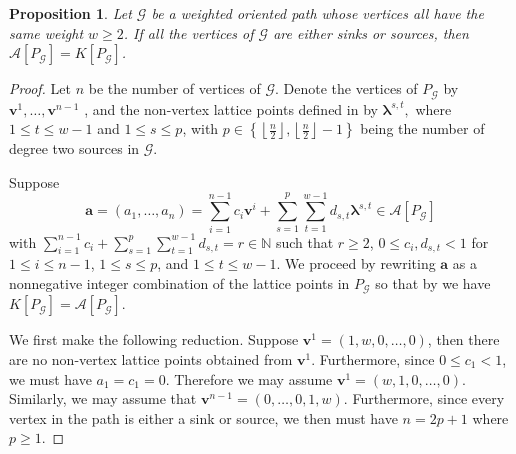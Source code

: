 \documentclass [12pt,a4paper,reqno]{amsart}
\theoremstyle{plain}
\newtheorem{Proposition}[Theorem]{Proposition}
\theoremstyle{definition}
\newtheorem{Assumptions and Discussion}[Theorem]{Assumptions and Discussion}
\theoremstyle{remark}
\newcommand\bflam{\boldsymbol{\lambda}}
\newcommand\calA{\mathcal{A}}
\newcommand\calG{\mathcal{G}}
\begin{document}
\begin{Proposition}
    \label{PathSinkSource}
    Let $\calG$ be a weighted oriented path whose vertices all have the same weight $w\geq 2$. If all the vertices of $\calG$ are either sinks or sources, then $ \calA[P_{\calG}]=K[P_{\calG}]$.
\end{Proposition}


\begin{proof}
Let $n$ be the number of vertices of $\mathcal{G}$. Denote the vertices of $P_{\mathcal{G}}$ by 
$\mathbf{v}^1, \dots, \mathbf{v}^{n-1}$ , 
and the non-vertex lattice points defined in  by $\boldsymbol{\lambda}^{s,t},$ where $1 \le t \le w-1$ and $1 \le s \le p$, with 
$p \in\left\{ \left\lfloor \frac{n}{2} \right\rfloor,\left\lfloor \frac{n}{2} \right\rfloor - 1\right\}$ being the number of degree two sources in $\mathcal{G}$.

Suppose 
\[\mathbf{a}=(a_1,\ldots,a_n) =\sum_{i=1}^{n-1}c_i\mathbf{v}^i+\sum_{s=1}^{p}\sum_{t=1}^{w-1}d_{s,t}\bflam^{s,t}\in \calA[P_{\calG}]\] 
with $\sum_{i=1}^{n-1}c_i+\sum_{s=1}^{p}\sum_{t=1}^{w-1}d_{s,t}=r\in\mathbb{N}$ such that $r\geq 2$, $0\leq c_i,d_{s,t}<1$ for $1\leq i\leq n-1$, $1\leq s\leq p$, and $1\leq t\leq w-1$. We proceed by rewriting $\mathbf{a}$ as a nonnegative integer combination of the lattice points in $P_{\calG}$ so that by  we have $K[P_{\calG}]=\calA[P_{\calG}]$. 

We first make the following reduction. Suppose $\mathbf{v}^1=(1,w,0,\ldots,0)$, then there are no non-vertex lattice points obtained from $\mathbf{v}^1$. Furthermore, since $0\leq c_1<1$, we must have $a_1=c_1=0$. Therefore we may assume $\mathbf{v}^1=(w,1,0,\ldots,0)$. Similarly, we may assume that  $\mathbf{v}^{n-1}=(0,\ldots,0,1,w)$. Furthermore, since every vertex in the path is either a sink or source, we then must have $n=2p+1$ where $p\geq 1$. 


\end{proof}
\end{document}
